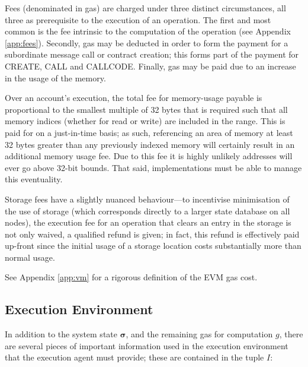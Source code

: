 \documentclass[9pt,oneside]{amsart}
\begin{document}
\begin{multicols}{2}
Fees (denominated in gas) are charged under three distinct circumstances, all three as prerequisite to the execution of an operation. The first and most common is the fee intrinsic to the computation of the operation (see Appendix \ref{app:fees}). Secondly, gas may be deducted in order to form the payment for a subordinate message call or contract creation; this forms part of the payment for {\small CREATE}, {\small CALL} and {\small CALLCODE}. Finally, gas may be paid due to an increase in the usage of the memory.

Over an account's execution, the total fee for memory-usage payable is proportional to the smallest multiple of 32 bytes that is required such that all memory indices (whether for read or write) are included in the range. This is paid for on a just-in-time basis; as such, referencing an area of memory at least 32 bytes greater than any previously indexed memory will certainly result in an additional memory usage fee. Due to this fee it is highly unlikely addresses will ever go above 32-bit bounds. That said, implementations must be able to manage this eventuality.

Storage fees have a slightly nuanced behaviour---to incentivise minimisation of the use of storage (which corresponds directly to a larger state database on all nodes), the execution fee for an operation that clears an entry in the storage is not only waived, a qualified refund is given; in fact, this refund is effectively paid up-front since the initial usage of a storage location costs substantially more than normal usage.

See Appendix \ref{app:vm} for a rigorous definition of the EVM gas cost.

\subsection{Execution Environment}

In addition to the system state $\boldsymbol{\sigma}$, and the remaining gas for computation $g$, there are several pieces of important information used in the execution environment that the execution agent must provide; these are contained in the tuple $I$:


\end{multicols}
\end{document}
